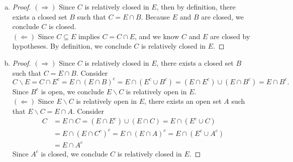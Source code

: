 \begin{Exercise}
\begin{enumerate}[a)]
\item
\begin{proof}
$(\Longrightarrow)$
Since $C$ is relatively closed in $E$, then by definition, there exists a closed set $B$ such that $C=E\cap B$. Because $E$ and $B$ are closed, we conclude $C$ is closed.\\

$(\Longleftarrow)$
Since $C\subseteq E$ implies $C=C\cap E$, and we know $C$ and $E$ are closed by hypotheses. By definition, we conclude $C$ is relatively closed in $E$.
\end{proof}

\item
\begin{proof}
$(\Longrightarrow)$
Since $C$ is relatively closed in $E$, there exists a closed set $B$ such that $C=E\cap B$. Consider
$$
C\backslash E 
= C\cap E^c 
= E\cap \left(E\cap B \right)^c 
= E\cap \left( E^c\cup B^c \right) 
= \left( E\cap E^c\right) \cup \left( E \cap B^c\right)
= E\cap B^c.
$$
Since $B^c$ is open, we conclude $E\backslash C$ is relatively open in $E$.\\

$(\Longleftarrow)$
Since $E\backslash C$ is relatively open in $E$, there exists an open set $A$ such that $E\backslash C = E\cap A$. Consider
\begin{align*}
C
&= E\cap C
= \left( E\cap E^c \right) \cup \left(E \cap C\right)
= E\cap \left( E^c \cup C \right) \\
&= E\cap \left( E\cap C^c \right)^c
= E\cap \left( E\cap A \right)^c
= E\cap \left( E^c \cup A^c \right) \\
&= E \cap A^c
\end{align*}
Since $A^c$ is closed, we conclude $C$ is relatively closed in $E$.
\end{proof}

\end{enumerate}
\end{Exercise}